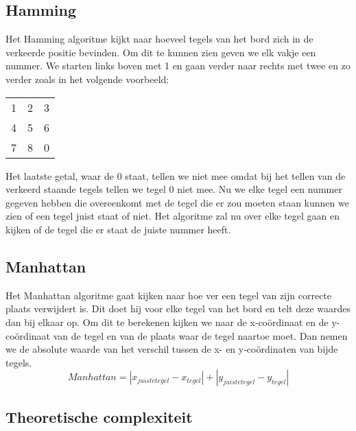 \documentclass[12pt, letterpaper]{article}
\begin{document}
\subsection*{Hamming}
Het Hamming algoritme kijkt naar hoeveel tegels van het bord zich in de verkeerde positie
bevinden. Om dit te kunnen zien geven we elk vakje een nummer. We starten links boven met 1 en
gaan verder naar rechts met twee en zo verder zoals in het volgende voorbeeld:\newline
\begin{tabular}{c c c}
    1 & 2 & 3\\
    4 & 5 & 6\\
    7 & 8 & 0
\end{tabular}\newline
Het laatste getal, waar de 0 staat, tellen we niet mee omdat bij het tellen van de verkeerd staande
tegels tellen we tegel 0 niet mee. \newline
Nu we elke tegel een nummer gegeven hebben die overeenkomt met de tegel die er zou moeten staan
kunnen we zien of een tegel juist staat of niet. Het algoritme zal nu over elke tegel gaan en 
kijken of de tegel die er staat de juiste nummer heeft.
\subsection*{Manhattan}
Het Manhattan algoritme gaat kijken naar hoe ver een tegel van zijn correcte plaats verwijdert is.
Dit doet hij voor elke tegel van het bord en telt deze waardes dan bij elkaar op. Om dit te berekenen
kijken we naar de x-coördinaat en de y-coördinaat van de tegel en van de plaats waar de tegel naartoe
moet. Dan nemen we de absolute waarde van het verschil tussen de x- en y-coördinaten van bijde tegels.
\[Manhattan = |x_{juiste tegel} - x_{tegel}| + |y_{juiste tegel} - y_{tegel}|\]
\subsection{Theoretische complexiteit}
\end{document}
